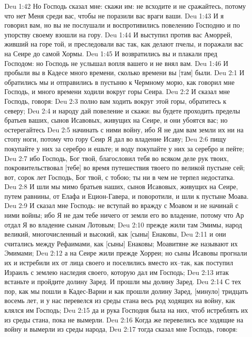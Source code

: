 Deu 1:42  Но Господь сказал мне: скажи им: не всходите и не сражайтесь, потому что нет Меня среди вас, чтобы не поразили вас враги ваши.
Deu 1:43  И я говорил вам, но вы не послушали и воспротивились повелению Господню и по упорству своему взошли на гору.
Deu 1:44  И выступил против вас Аморрей, живший на горе той, и преследовали вас так, как делают пчелы, и поражали вас на Сеире до самой Хормы.
Deu 1:45  И возвратились вы и плакали пред Господом: но Господь не услышал вопля вашего и не внял вам.
Deu 1:46  И пробыли вы в Кадесе много времени, сколько времени вы [там] были.
Deu 2:1  И обратились мы и отправились в пустыню к Чермному морю, как говорил мне Господь, и много времени ходили вокруг горы Сеира.
Deu 2:2  И сказал мне Господь, говоря:
Deu 2:3  полно вам ходить вокруг этой горы, обратитесь к северу;
Deu 2:4  и народу дай повеление и скажи: вы будете проходить пределы братьев ваших, сынов Исавовых, живущих на Сеире, и они убоятся вас; но остерегайтесь
Deu 2:5  начинать с ними войну, ибо Я не дам вам земли их ни на стопу ноги, потому что гору Сеир Я дал во владение Исаву;
Deu 2:6  пищу покупайте у них за серебро и ешьте; и воду покупайте у них за серебро и пейте;
Deu 2:7  ибо Господь, Бог твой, благословил тебя во всяком деле рук твоих, покровительствовал [тебе] во время путешествия твоего по великой пустыне сей; вот, сорок лет Господь, Бог твой, с тобою; ты ни в чем не терпел недостатка.
Deu 2:8  И шли мы мимо братьев наших, сынов Исавовых, живущих на Сеире, путем равнины, от Елафа и Ецион-Гавера, и поворотили, и шли к пустыне Моава.
Deu 2:9  И сказал мне Господь: не вступай во вражду с Моавом и не начинай с ними войны; ибо Я не дам тебе ничего от земли его во владение, потому что Ар отдал Я во владение сынам Лотовым;
Deu 2:10  прежде жили там Эмимы, народ великий, многочисленный и высокий, как [сыны] Енаковы,
Deu 2:11  и они считались между Рефаимами, как [сыны] Енаковы; Моавитяне же называют их Эмимами;
Deu 2:12  а на Сеире жили прежде Хорреи; но сыны Исавовы прогнали их и истребили их от лица своего и поселились вместо их--так, как поступил Израиль с землею наследия своего, которую дал им Господь;
Deu 2:13  итак встаньте и пройдите долину Заред. И прошли мы долину Заред.
Deu 2:14  С тех пор, как мы пошли в Кадес-Варни и как прошли долину Заред, [минуло] тридцать восемь лет, и у нас перевелся из среды стана весь род ходящих на войну, как клялся им Господь;
Deu 2:15  да и рука Господня была на них, чтоб истреблять их из среды стана, пока не вымерли.
Deu 2:16  Когда же перевелись все ходящие на войну и вымерли из среды народа,
Deu 2:17  тогда сказал мне Господь, говоря:
